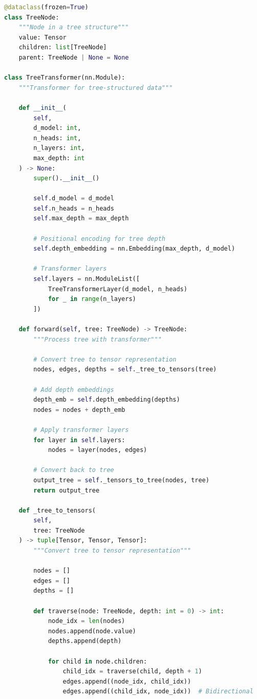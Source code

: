 \begin{lstlisting}[language=Python, caption=Tree Transformer Implementation]
@dataclass(frozen=True)
class TreeNode:
    """Node in a tree structure"""
    value: Tensor
    children: list[TreeNode]
    parent: TreeNode | None = None

class TreeTransformer(nn.Module):
    """Transformer for tree-structured data"""

    def __init__(
        self,
        d_model: int,
        n_heads: int,
        n_layers: int,
        max_depth: int
    ) -> None:
        super().__init__()

        self.d_model = d_model
        self.n_heads = n_heads
        self.max_depth = max_depth

        # Positional encoding for tree depth
        self.depth_embedding = nn.Embedding(max_depth, d_model)

        # Transformer layers
        self.layers = nn.ModuleList([
            TreeTransformerLayer(d_model, n_heads)
            for _ in range(n_layers)
        ])

    def forward(self, tree: TreeNode) -> TreeNode:
        """Process tree with transformer"""

        # Convert tree to tensor representation
        nodes, edges, depths = self._tree_to_tensors(tree)

        # Add depth embeddings
        depth_emb = self.depth_embedding(depths)
        nodes = nodes + depth_emb

        # Apply transformer layers
        for layer in self.layers:
            nodes = layer(nodes, edges)

        # Convert back to tree
        output_tree = self._tensors_to_tree(nodes, tree)
        return output_tree

    def _tree_to_tensors(
        self,
        tree: TreeNode
    ) -> tuple[Tensor, Tensor, Tensor]:
        """Convert tree to tensor representation"""

        nodes = []
        edges = []
        depths = []

        def traverse(node: TreeNode, depth: int = 0) -> int:
            node_idx = len(nodes)
            nodes.append(node.value)
            depths.append(depth)

            for child in node.children:
                child_idx = traverse(child, depth + 1)
                edges.append((node_idx, child_idx))
                edges.append((child_idx, node_idx))  # Bidirectional


\end{lstlisting}
